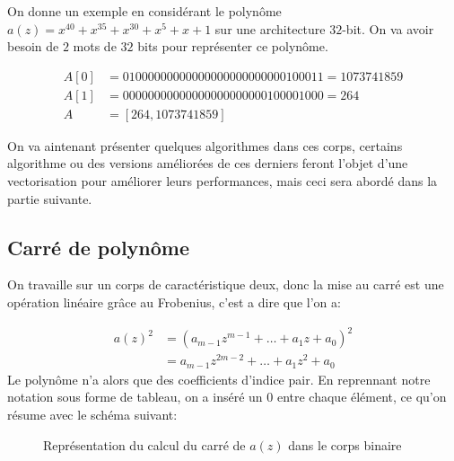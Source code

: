 \documentclass[12pt]{article}
\begin{document}
On donne un exemple en considérant le polynôme $a(z) = x^{40} + x^{35} + x^{30} + x^{5} + x +1$ sur une architecture $32$-bit. On va avoir besoin de $2$ mots de $32$ bits pour représenter ce polynôme.

\begin{align*}
A[0] &= 01000000000000000000000000100011 = 1073741859 \\
A[1] &= 00000000000000000000000100001000 = 264 \\
A &= [264, 1073741859 ]
\end{align*}

On va aintenant présenter quelques algorithmes dans ces corps, certains algorithme ou des versions améliorées de ces derniers feront l'objet d'une vectorisation pour améliorer leurs performances, mais ceci sera abordé dans la partie suivante.

\subsection{Carré de polynôme}
On travaille sur un corps de caractéristique deux, donc la mise au carré est une opération linéaire grâce au Frobenius, c'est a dire que l'on a:

\begin{align*}
    a(z)^2 &= (a_{m-1}z^{m-1} + \ldots + a_1z + a_0)^2 \\
           &= a_{m-1}z^{2m-2} + \ldots + a_1z^2 + a_0
\end{align*}
Le polynôme n'a alors que des coefficients d'indice pair. En reprennant notre notation sous forme de tableau, on a inséré un $0$ entre chaque élément, ce qu'on résume avec le schéma suivant:

\newpage
\begin{figure}
    \centering
{}
    \caption{Représentation du calcul du carré de $a(z)$ dans le corps binaire}
    \label{fig:squaring}
\end{figure}
\end{document}
